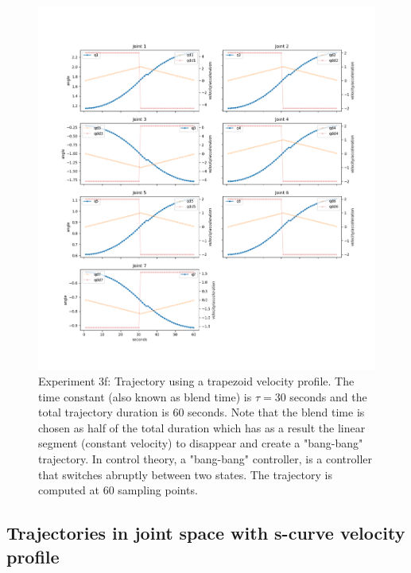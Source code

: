 \begin{center}
\begin{figure}[H]
\centering
\includegraphics[width=\textwidth]{images/robot_planner3/3f_trapezoid2.png}
\caption{Experiment 3f: Trajectory using a trapezoid velocity profile. The time constant (also known as blend time) is $τ = 30$ seconds and the total trajectory duration is 60 seconds. Note that 
the blend time is chosen as half of the total duration which has as a result the linear segment (constant velocity) to disappear and create a "bang-bang" trajectory. In control theory, a "bang-bang" controller, 
is a controller that switches abruptly between two states. The trajectory is computed at 60 sampling points.}
\label{robot-planner3f-joint-trapezoid2}
\end{figure}
\end{center}


\subsection{Trajectories in joint space with s-curve velocity profile}

